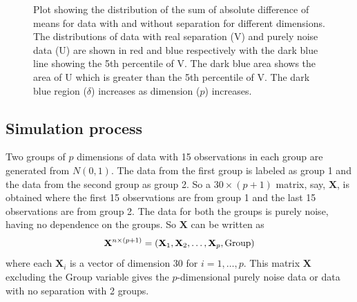 \begin{figure}[hbtp]
   \centering
       \caption{Plot showing the distribution of the sum of absolute difference of means for data with and without separation for different dimensions. The distributions of data with real separation (V) and purely noise data (U) are shown in red and blue respectively with the dark blue line showing the 5th percentile of V. The dark blue area shows the area of U which is greater than the 5th percentile of V. The dark blue region ($\delta$) increases as dimension ($p$) increases. }
     \label{fig:dimen}
\end{figure}

\subsection{Simulation process}

Two groups of $p$ dimensions of data with 15 observations in each group are generated from $N(0, 1)$.  The data from the first group is labeled as group 1 and the data from the second group as group 2. So a $30 \times (p + 1)$ matrix, say, $\mathbf{X}$, is obtained where the first 15 observations are from group 1 and the last 15 observations are from group 2. The data for both the groups is purely noise, having no dependence on the groups. So $\mathbf{X}$ can be written as
$$\mathbf{X}^{n \times (p + 1)} = (\mathbf{X}_1, \mathbf{X}_2, \dots, \mathbf{X}_p, \hbox{Group})$$ where each $\mathbf{X}_i$ is a vector of dimension 30 for $i = 1, \dots, p$. This matrix $\mathbf{X}$ excluding the Group variable gives the $p$-dimensional purely noise data or data with no separation with 2 groups.

